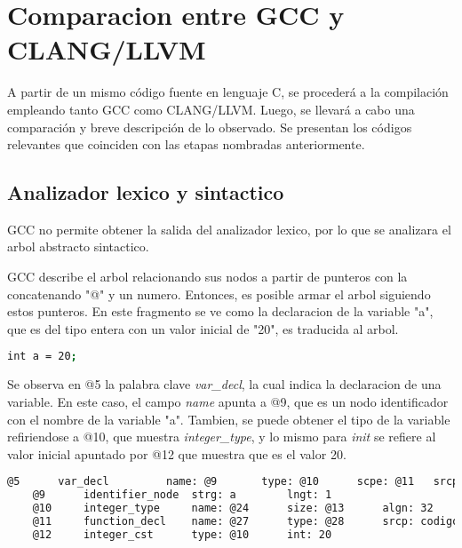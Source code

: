 \chapter{Comparacion entre GCC y CLANG/LLVM}

A partir de un mismo código fuente en lenguaje C, 
se procederá a la compilación empleando tanto GCC como CLANG/LLVM. 
Luego, se llevará a cabo una comparación y breve descripción de lo
observado. Se presentan los códigos relevantes que coinciden 
con las etapas nombradas anteriormente.

\section{Analizador lexico y sintactico}
GCC no permite obtener la salida del analizador lexico, por lo que se analizara 
el arbol abstracto sintactico. 

GCC describe el arbol relacionando sus nodos a partir de punteros con la concatenando 
"@" y un numero. Entonces, es posible armar el arbol siguiendo estos punteros. 
En este fragmento se ve como la declaracion de la variable "a", que es del tipo entera con 
un valor inicial de "20", es traducida al arbol.

\begin{lstlisting}[label=comandoC, caption= Fragmento del codigo fuente del archivo codigo-ejemplo.c. \cite{repositorio}, language=bash]
    int a = 20;      \end{lstlisting}

Se observa en @5 la palabra clave \emph{var\_decl}, la cual indica la declaracion de una variable. En este 
caso, el campo \emph{name} apunta a @9, que es un nodo identificador con el nombre de la variable "a". 
Tambien, se puede obtener el tipo de la variable refiriendose a @10, que muestra \emph{integer\_type}, y lo 
mismo para \emph{init} se refiere al valor inicial apuntado por @12 que muestra que es el valor 20.

\begin{lstlisting}[label=comandoC, caption= Fragmento del arbol de GCC del archivo codigo-ejemplo.c.005t.original. \cite{repositorio}, language=bash]
    @5      var_decl         name: @9       type: @10      scpe: @11   srcp: codigo-ejemplo.c:5      init: @12     
    @9      identifier_node  strg: a        lngt: 1       
    @10     integer_type     name: @24      size: @13      algn: 32      prec: 32       sign: signed   min : @25     max : @26     
    @11     function_decl    name: @27      type: @28      srcp: codigo-ejemplo.c:3      
    @12     integer_cst      type: @10      int: 20    \end{lstlisting}

